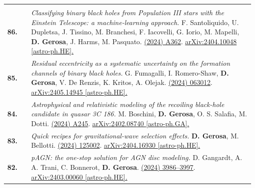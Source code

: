 {\begin{longtable}{rp{0.3cm}p{15.8cm}}
\vspace{0.09cm}\\
%
\textbf{86.} & & \textit{Classifying binary black holes from Population III stars with the Einstein Telescope: a machine-learning approach.}
\newline{}
F. Santoliquido, U. Dupletsa, J. Tissino, M. Branchesi, F. Iacovelli, G. Iorio, M. Mapelli, \textbf{D. Gerosa}, J. Harms, M. Pasquato.
\newline{}
\href{https://doi.org/10.1051/0004-6361/202450381}{\aap 690 (2024) A362}. \href{https://arxiv.org/abs/2404.10048}{arXiv:2404.10048 [astro-ph.HE].}
\vspace{0.09cm}\\
%
\textbf{85.} & & \textit{Residual eccentricity as a systematic uncertainty on the formation channels of binary black holes.}
\newline{}
G. Fumagalli, I. Romero-Shaw, \textbf{D. Gerosa}, V. De Renzis, K. Kritos, A. Olejak.
\newline{}
\href{https://journals.aps.org/prd/abstract/10.1103/PhysRevD.110.063012}{\prd 110 (2024) 063012}. \href{https://arxiv.org/abs/2405.14945}{arXiv:2405.14945 [astro-ph.HE].}
\vspace{0.09cm}\\
%
\textbf{84.} & & \textit{Astrophysical and relativistic modeling of the recoiling black-hole candidate in quasar 3C 186.}
\newline{}
M. Boschini, \textbf{D. Gerosa}, O. S. Salafia, M. Dotti.
\newline{}
\href{https://doi.org/10.1051/0004-6361/202449596}{\aap 686 (2024) A245}. \href{https://arxiv.org/abs/2402.08740}{arXiv:2402.08740 [astro-ph.GA].}
\vspace{0.09cm}\\
%
\textbf{83.} & & \textit{Quick recipes for gravitational-wave selection effects.}
\newline{}
\textbf{D. Gerosa}, M. Bellotti.
\newline{}
\href{https://iopscience.iop.org/article/10.1088/1361-6382/ad4509}{\cqg 41 (2024) 125002}. \href{https://arxiv.org/abs/2404.16930}{arXiv:2404.16930 [astro-ph.HE].}
\vspace{0.09cm}\\
%
\textbf{82.} & & \textit{pAGN: the one-stop solution for AGN disc modeling.}
\newline{}
D. Gangardt, A. A. Trani, C. Bonnerot, \textbf{D. Gerosa}.
\newline{}
\href{https://doi.org/10.1093/mnras/stae1117}{\mnras 530 (2024) 3986–3997}. \href{https://arxiv.org/abs/2403.00060}{arXiv:2403.00060 [astro-ph.HE].}

\end{longtable}}
